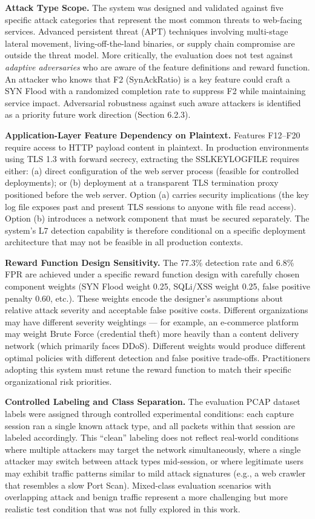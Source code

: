 \documentclass[12pt,a4paper]{report}
\begin{document}
\textbf{Attack Type Scope.} The system was designed and validated against five specific attack categories that represent the most common threats to web-facing services. Advanced persistent threat (APT) techniques involving multi-stage lateral movement, living-off-the-land binaries, or supply chain compromise are outside the threat model. More critically, the evaluation does not test against \textit{adaptive adversaries} who are aware of the feature definitions and reward function. An attacker who knows that F2 (SynAckRatio) is a key feature could craft a SYN Flood with a randomized completion rate to suppress F2 while maintaining service impact. Adversarial robustness against such aware attackers is identified as a priority future work direction (Section 6.2.3).

\textbf{Application-Layer Feature Dependency on Plaintext.} Features F12--F20 require access to HTTP payload content in plaintext. In production environments using TLS 1.3 with forward secrecy, extracting the SSLKEYLOGFILE requires either: (a) direct configuration of the web server process (feasible for controlled deployments); or (b) deployment at a transparent TLS termination proxy positioned before the web server. Option (a) carries security implications (the key log file exposes past and present TLS sessions to anyone with file read access). Option (b) introduces a network component that must be secured separately. The system's L7 detection capability is therefore conditional on a specific deployment architecture that may not be feasible in all production contexts.

\textbf{Reward Function Design Sensitivity.} The 77.3\% detection rate and 6.8\% FPR are achieved under a specific reward function design with carefully chosen component weights (SYN Flood weight 0.25, SQLi/XSS weight 0.25, false positive penalty 0.60, etc.). These weights encode the designer's assumptions about relative attack severity and acceptable false positive costs. Different organizations may have different severity weightings --- for example, an e-commerce platform may weight Brute Force (credential theft) more heavily than a content delivery network (which primarily faces DDoS). Different weights would produce different optimal policies with different detection and false positive trade-offs. Practitioners adopting this system must retune the reward function to match their specific organizational risk priorities.

\textbf{Controlled Labeling and Class Separation.} The evaluation PCAP dataset labels were assigned through controlled experimental conditions: each capture session ran a single known attack type, and all packets within that session are labeled accordingly. This ``clean'' labeling does not reflect real-world conditions where multiple attackers may target the network simultaneously, where a single attacker may switch between attack types mid-session, or where legitimate users may exhibit traffic patterns similar to mild attack signatures (e.g., a web crawler that resembles a slow Port Scan). Mixed-class evaluation scenarios with overlapping attack and benign traffic represent a more challenging but more realistic test condition that was not fully explored in this work.
\end{document}
